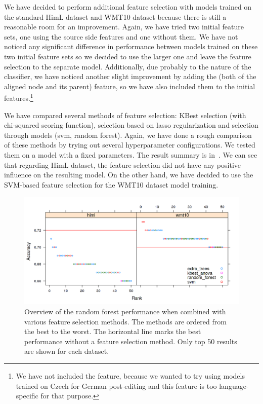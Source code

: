 We have decided to perform additional feature selection with models trained on the standard HimL dataset
and WMT10 dataset because there is still a reasonable room for an improvement. Again, we have tried two initial feature
sets, one using the source side features and one without them. We have not noticed any significant difference in performance
between models trained on these two initial feature sets so we decided to use the larger one and leave
the feature selection to the separate model. Additionally, due probably to the nature of the classifier, we have noticed
another slight improvement by adding the  (both of the aligned node and its parent) feature, so we have also
included them to the initial features.\footnote{We have not included the  feature, because we wanted to
try using models trained on Czech for German post-editing and this feature is too language-specific for that purpose.}

We have compared several methods of feature selection: KBest selection
(with chi-squared scoring function), selection based on lasso regularization and selection through
models (svm, random forest). Again, we have done a rough comparison of these methods by trying out
several hyperparameter configurations. We tested them on a model with a fixed parameters. The result summary
is in~. We can see that regarding HimL dataset, the feature selection did not have
any positive influence on the resulting model. On the other hand, we have decided to use the SVM-based
feature selection for the WMT10 dataset model training.

\begin{figure}
\centering
  \includegraphics[scale=0.7]{cat-sel}
  \caption{
    Overview of the random forest performance when combined with various feature selection methods.
The methods are ordered from the best to the worst. The horizontal line marks the best performance without
a feature selection method. Only top 50 results are shown for each dataset.
}
  \label{cats-sel}
\end{figure}

